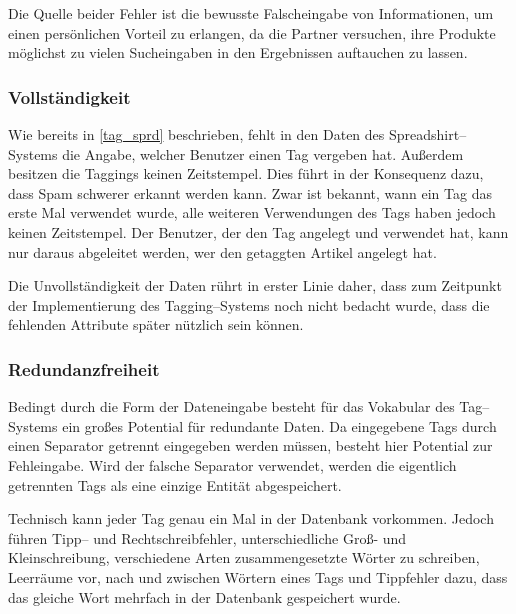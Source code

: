 Die Quelle beider Fehler ist die bewusste Falscheingabe von Informationen, um einen persönlichen Vorteil zu erlangen, da die Partner versuchen, ihre Produkte möglichst zu vielen Sucheingaben in den Ergebnissen auftauchen zu lassen.
                                                                                                                                                                                                                                                                                                                                                                                                              
\subsubsection{Vollständigkeit}

Wie bereits in \cref{tag_sprd} beschrieben, fehlt in den Daten des Spreadshirt--Systems die Angabe, welcher Benutzer einen Tag vergeben hat. Außerdem besitzen die Taggings keinen Zeitstempel. Dies führt in der Konsequenz dazu, dass Spam schwerer erkannt werden kann. Zwar ist bekannt, wann ein Tag das erste Mal verwendet wurde, alle weiteren Verwendungen des Tags haben jedoch keinen Zeitstempel. Der Benutzer, der den Tag angelegt und verwendet hat, kann nur daraus abgeleitet werden, wer den getaggten Artikel angelegt hat.

Die Unvollständigkeit der Daten rührt in erster Linie daher, dass zum Zeitpunkt der Implementierung des Tagging--Systems noch nicht bedacht wurde, dass die fehlenden Attribute später nützlich sein können.

\subsubsection{Redundanzfreiheit}

Bedingt durch die Form der Dateneingabe besteht für das Vokabular des Tag--Systems ein großes Potential für redundante Daten. Da eingegebene Tags durch einen Separator getrennt eingegeben werden müssen, besteht hier Potential zur Fehleingabe. Wird der falsche Separator verwendet, werden die eigentlich getrennten Tags als eine einzige Entität abgespeichert.

Technisch kann jeder Tag genau ein Mal in der Datenbank vorkommen. Jedoch führen Tipp-- und Rechtschreibfehler, unterschiedliche Groß- und Kleinschreibung, verschiedene Arten zusammengesetzte Wörter zu schreiben, Leerräume vor, nach und zwischen Wörtern eines Tags und Tippfehler dazu, dass das gleiche Wort mehrfach in der Datenbank gespeichert wurde.

